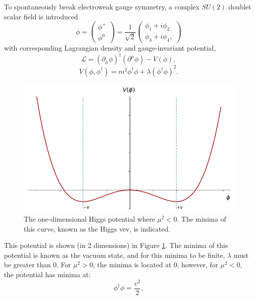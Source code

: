 To spontaneously break electroweak gauge symmetry, a complex $SU(2)$ doublet scalar field is introduced
\begin{equation}
\phi = \begin{pmatrix} \phi^+ \\ \phi^0 \end{pmatrix}
    = \frac{1}{\sqrt{2}}\begin{pmatrix}
        \phi_1 + i\phi_2 \\ \phi_3 + i\phi_4,
    \end{pmatrix}
\end{equation}
%
with corresponding Lagrangian density and gauge-invariant potential,
\begin{equation}
    \mathcal{L} = (\partial_{\mu}\phi)^\dagger (\partial^{\mu}\phi) - V(\phi),
\end{equation}
\begin{equation}
    V(\phi,\phi^\dagger) = m^2 \phi^\dagger \phi + \lambda (\phi^\dagger \phi)^2.
\end{equation}
%
\begin{figure}[!ht]
    \centering
    \includegraphics[width=\textwidth]{chapters/chapter1_theory/images/higgs-2d-vev.png}
    \caption{The one-dimensional Higgs potential where $\mu^2 <0$. The minima of this curve, known as the Higgs \gls{vev}, is indicated.}
    \label{fig:higgs-potential}
\end{figure}
%
This potential is shown (in 2 dimensions) in Figure \ref{fig:higgs-potential}. The minima of this potential is known as the vacuum state, and for this minima to be finite, $\lambda$ must be greater than 0. For $\mu^2 >0$, the minima is located at 0, however, for $\mu^2<0$, the potential has minima at:
%
\begin{equation}
    \phi^\dagger \phi = \frac{v^2}{2},
\end{equation}
